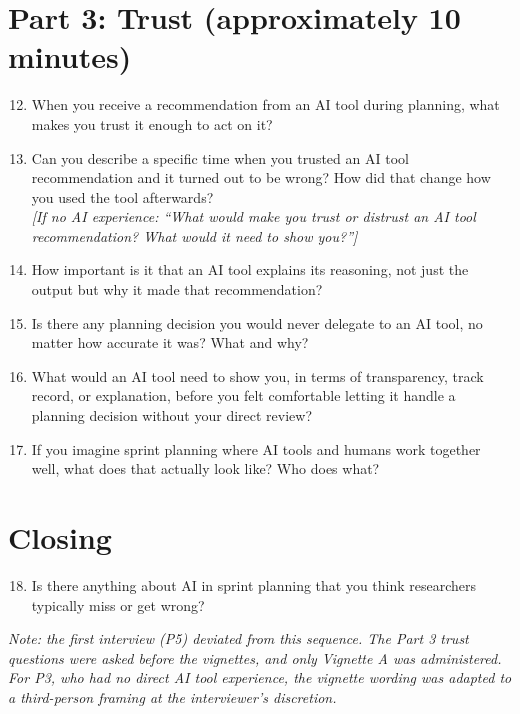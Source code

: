 \documentclass[a4paper,twoside]{bth}
\begin{document}
\section*{Part 3: Trust (approximately 10 minutes)}

\begin{enumerate}
  \setcounter{enumi}{11}
  \item When you receive a recommendation from an AI tool during planning, what makes you trust it enough to act on it?
  \item Can you describe a specific time when you trusted an AI tool recommendation and it turned out to be wrong? How did that change how you used the tool afterwards?\\
  \textit{[If no AI experience: ``What would make you trust or distrust an AI tool recommendation? What would it need to show you?'']}
  \item How important is it that an AI tool explains its reasoning, not just the output but why it made that recommendation?
  \item Is there any planning decision you would never delegate to an AI tool, no matter how accurate it was? What and why?
  \item What would an AI tool need to show you, in terms of transparency, track record, or explanation, before you felt comfortable letting it handle a planning decision without your direct review?
  \item If you imagine sprint planning where AI tools and humans work together well, what does that actually look like? Who does what?
\end{enumerate}

\section*{Closing}

\begin{enumerate}
  \setcounter{enumi}{17}
  \item Is there anything about AI in sprint planning that you think researchers typically miss or get wrong?
\end{enumerate}

\textit{Note: the first interview (P5) deviated from this sequence. The Part 3 trust questions were asked before the vignettes, and only Vignette A was administered. For P3, who had no direct AI tool experience, the vignette wording was adapted to a third-person framing at the interviewer's discretion.}
\end{document}
